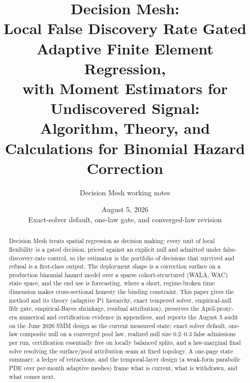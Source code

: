 \documentclass[11pt]{article}
\title{Decision Mesh:\\Local False Discovery Rate Gated Adaptive Finite Element Regression,\\
with Moment Estimators for Undiscovered Signal:\\
\large Algorithm, Theory, and Calculations for Binomial Hazard Correction}
\author{Decision Mesh working notes}
\date{August 5, 2026\\Exact-solver default, one-law gate, and converged-law revision}
\begin{document}
\maketitle

\begin{abstract}
Decision Mesh treats spatial regression as decision making: every unit of local
flexibility is a gated decision, priced against an explicit null and admitted under
false-discovery-rate control, so the estimator is the portfolio of decisions that
survived and refusal is a first-class output. The deployment shape is a correction
surface on a production binomial hazard model over a sparse cohort-structured
(WALA, WAC) state space, and the end use is forecasting, where a short, regime-broken
time dimension makes cross-sectional honesty the binding constraint. This paper gives
the method and its theory (adaptive P1 hierarchy, exact tempered solver, empirical-null
lfdr gate, empirical-Bayes shrinkage, residual attribution), preserves the April-proxy-era
numerical and certification evidence in appendices, and reports the August 5 audit on the
June 2026 SMM design as the current measured state: exact solver default, one-law
composite null on a converged pool law, realized null size 0.2--0.3 false admissions per
run, certification essentially free on locally balanced splits, and a law-marginal final
solve resolving the surface/pool attribution seam at fixed topology. A one-page state
summary, a ledger of retractions, and the temporal-layer design (a weak-form parabolic
PDE over per-month adaptive meshes) frame what is current, what is withdrawn, and what
comes next.
\end{abstract}

\tableofcontents
\end{document}
